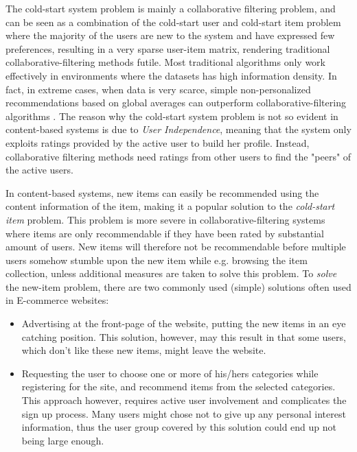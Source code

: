 The cold-start system problem is mainly a collaborative filtering problem, and
can be seen as a combination of the cold-start user and cold-start item problem
where the majority of the users are new to the system and have expressed few
preferences, resulting in a very sparse user-item matrix, rendering traditional
collaborative-filtering methods futile. Most traditional algorithms only work
effectively in environments where the datasets has high information density. In
fact, in extreme cases, when data is very scarce, simple non-personalized
recommendations based on global averages can outperform collaborative-filtering
algorithms \cite{Park2006}. The reason why the cold-start system problem is not
so evident in content-based systems is due to \emph{User Independence}, meaning
that the system only exploits ratings provided by the active user to build her
profile. Instead, collaborative filtering methods need ratings from other users
to find the "peers" of the active users.

In content-based systems, new items can easily be recommended using the content
information of the item, making it a popular solution to the \emph{cold-start
item} problem. This problem is more severe in collaborative-filtering systems
where items are only recommendable if they have been rated by substantial
amount of users. New items will therefore not be recommendable before multiple
users somehow stumble upon the new item while e.g. browsing the item
collection, unless additional measures are taken to solve this problem. To
\emph{solve} the new-item problem, there are two commonly used (simple)
solutions often used in E-commerce websites:

\begin{itemize}

\item Advertising at the front-page of the website, putting the new items in an
eye catching position. This solution, however, may this result in that some
users, which don't like these new items, might leave the website.
\item Requesting the user to choose one or more of his/hers categories while
registering for the site, and recommend items from the selected categories.
This approach however, requires active user involvement and complicates the
sign up process. Many users might chose not to give up any personal interest
information, thus the user group covered by this solution could end up not
being large enough.
\end{itemize}

